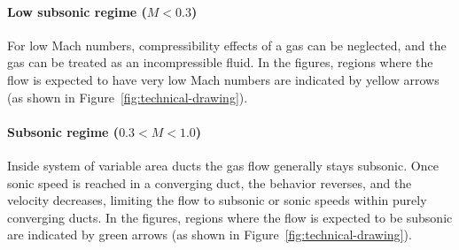 	\paragraph{Low subsonic regime ($M < 0.3$)}
		For low Mach numbers, compressibility effects of a gas can be neglected, and the gas can be treated as an incompressible fluid.
		In the figures, regions where the flow is expected to have very low Mach numbers are indicated by yellow arrows (as shown in Figure~\ref{fig:technical-drawing}).

	\paragraph{Subsonic regime ($0.3 < M < 1.0$)} 
		Inside system of variable area ducts the gas flow generally stays subsonic.
		Once sonic speed is reached in a converging duct, the behavior reverses, and the velocity decreases, limiting the flow to subsonic or sonic speeds within purely converging ducts.
		In the figures, regions where the flow is expected to be subsonic are indicated by green arrows (as shown in Figure~\ref{fig:technical-drawing}).\\
